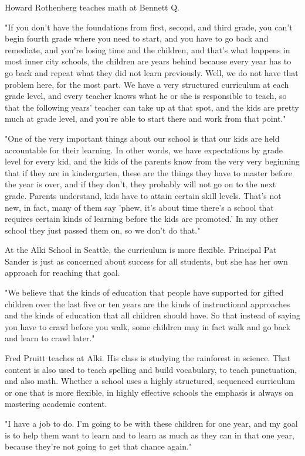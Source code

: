 Howard Rothenberg teaches math at Bennett Q.

"If you don't have the foundations from first, second, and third grade, you can't begin fourth grade where you need to start, and you have to go back and remediate, and you're losing time and the children, and that's what happens in most inner city schools, the children are years behind because every year has to go back and repeat what they did not learn previously. Well, we do not have that problem here, for the most part. We have a very structured curriculum at each grade level, and every teacher knows what he or she is responsible to teach, so that the following years' teacher can take up at that spot, and the kids are pretty much at grade level, and you're able to start there and work from that point."

"One of the very important things about our school is that our kids are held accountable for their learning. In other words, we have expectations by grade level for every kid, and the kids of the parents know from the very very beginning that if they are in kindergarten, these are the things they have to master before the year is over, and if they don't, they probably will not go on to the next grade. Parents understand, kids have to attain certain skill levels. That's not new, in fact, many of them say 'phew, it's about time there's a school that requires certain kinds of learning before the kids are promoted.' In my other school they just passed them on, so we don't do that."

At the Alki School in Seattle, the curriculum is more flexible. Principal Pat Sander is just as concerned about success for all students, but she has her own approach for reaching that goal.

"We believe that the kinds of education that people have supported for gifted children over the last five or ten years are the kinds of instructional approaches and the kinds of education that all children should have. So that instead of saying you have to crawl before you walk, some children may in fact walk and go back and learn to crawl later."

Fred Pruitt teaches at Alki. His class is studying the rainforest in science. That content is also used to teach spelling and build vocabulary, to teach punctuation, and also math. Whether a school uses a highly structured, sequenced curriculum or one that is more flexible, in highly effective schools the emphasis is always on mastering academic content.

"I have a job to do. I'm going to be with these children for one year, and my goal is to help them want to learn and to learn as much as they can in that one year, because they're not going to get that chance again."


